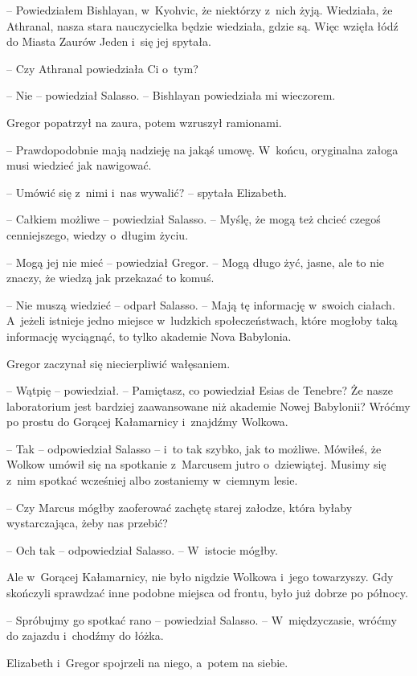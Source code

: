 \documentclass[oneside,polish,12pt,sfheadings]{mwbk}
\begin{document}
-- Powiedziałem Bishlayan, w~Kyohvic, że niektórzy z~nich żyją.
Wiedziała, że Athranal, nasza stara nauczycielka będzie wiedziała, gdzie
są. Więc wzięła łódź do Miasta Zaurów Jeden i~się jej spytała.

-- Czy Athranal powiedziała Ci o~tym?

-- Nie -- powiedział Salasso. -- Bishlayan powiedziała mi wieczorem.

Gregor popatrzył na zaura, potem wzruszył ramionami.

-- Prawdopodobnie mają nadzieję na jakąś umowę. W~końcu, oryginalna
załoga musi wiedzieć jak nawigować.

-- Umówić się z~nimi i~nas wywalić? -- spytała Elizabeth.

-- Całkiem możliwe -- powiedział Salasso. -- Myślę, że mogą też chcieć
czegoś cenniejszego, wiedzy o~długim życiu.

-- Mogą jej nie mieć -- powiedział Gregor. -- Mogą długo żyć, jasne, ale to
nie znaczy, że wiedzą jak przekazać to komuś.

-- Nie muszą wiedzieć -- odparł Salasso. -- Mają tę informację w~swoich
ciałach. A~jeżeli istnieje jedno miejsce w~ludzkich społeczeństwach,
które mogłoby taką informację wyciągnąć, to tylko akademie Nova
Babylonia.

Gregor zaczynał się niecierpliwić wałęsaniem.

-- Wątpię -- powiedział. -- Pamiętasz, co powiedział Esias de Tenebre? Że
nasze laboratorium jest bardziej zaawansowane niż akademie Nowej
Babylonii? Wróćmy po prostu do Gorącej Kałamarnicy i~znajdźmy Wolkowa.

-- Tak -- odpowiedział Salasso -- i~to tak szybko, jak to możliwe. Mówiłeś,
że Wolkow umówił się na spotkanie z~Marcusem jutro o~dziewiątej. Musimy
się z~nim spotkać wcześniej albo zostaniemy w~ciemnym lesie.

-- Czy Marcus mógłby zaoferować zachętę starej załodze, która byłaby
wystarczająca, żeby nas przebić?

-- Och tak -- odpowiedział Salasso. -- W~istocie mógłby.

Ale w~Gorącej Kałamarnicy, nie było nigdzie Wolkowa i~jego towarzyszy.
Gdy skończyli sprawdzać inne podobne miejsca od frontu, było już dobrze
po północy.

-- Spróbujmy go spotkać rano -- powiedział Salasso. -- W~międzyczasie,
wróćmy do zajazdu i~chodźmy do łóżka.

Elizabeth i~Gregor spojrzeli na niego, a~potem na siebie.
\end{document}
